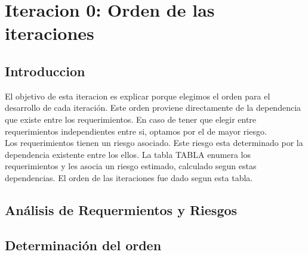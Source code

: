 \chapter{Iteracion 0: Orden de las iteraciones} %
\label{cha:iteracion_0}

\section{Introduccion} %
\label{it0:sec:introduccion}

El objetivo de esta iteracion es explicar porque elegimos el orden para el desarrollo de cada iteración. Este orden proviene directamente de la dependencia que existe entre los requerimientos. En caso de tener que elegir entre requerimientos independientes entre si, optamos por el de mayor riesgo. \\

Los requerimientos tienen un riesgo asociado. Este riesgo esta determinado por la dependencia existente entre los ellos. La tabla TABLA enumera los requerimientos y les asocia un riesgo estimado, calculado segun estas dependencias. El orden de las iteraciones fue dado segun esta tabla.



\section{Análisis de Requermientos y Riesgos} %
\label{it0:sec:analisis_de_requermientos_y_riesgos}





\section{Determinación del orden} %
\label{it0:sec:determinacion_del_orden}

